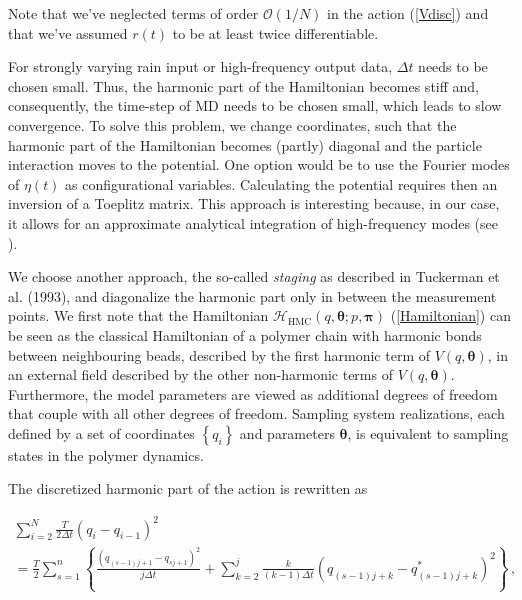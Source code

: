 \documentclass[11pt, a4paper]{article}
\newcommand{\bt}{\pmb\theta}
\begin{document}
Note that we've neglected terms of order $\mathcal O(1/N)$ in the action (\ref{Vdisc}) and that we've assumed $r(t)$ to be at least twice differentiable.


For strongly varying rain input or high-frequency output data, $\Delta t$ needs to be chosen small. Thus, the harmonic part of the Hamiltonian becomes stiff and, consequently, the time-step of MD needs to be chosen small, which leads to slow convergence.
To solve this problem, we change coordinates, such that the harmonic part of the Hamiltonian becomes (partly) diagonal and the particle interaction moves to the potential.
One option would be to use the Fourier modes of ${\eta}(t)$ as configurational variables. Calculating the potential requires then an inversion of a Toeplitz matrix. This approach is interesting because, in our case, it allows for an approximate analytical integration of high-frequency modes (see \cite{doll_1985_fourier}).

We choose another approach, the so-called \emph{staging} as described in Tuckerman et al. (1993), and diagonalize the harmonic part only in between the measurement points.
We first note that the Hamiltonian $\mathcal{H}_{\text{HMC}}(q,\bt; p,{\pmb\pi})$ (\ref{Hamiltonian}) can be seen as the classical Hamiltonian of a polymer chain with harmonic bonds between neighbouring beads, described by the first harmonic term of $V(q,\bt)$, in an external field described by the other non-harmonic terms of $V(q,\bt)$. 
Furthermore, the model parameters are viewed as additional degrees of freedom that couple with all other degrees of freedom. 
Sampling system realizations, each defined by a set of coordinates $\left\{ q_i\right\}$ and parameters $\bt$, is equivalent to sampling states in the polymer dynamics.

The discretized harmonic part of the action is rewritten as

\begin{multline}
  \sum_{i=2}^{N}
  \frac{T}{2\Delta t}
  (q_i-q_{i-1})^2
  \\ =
  \frac{T}{2}
  \sum_{s=1}^{n}\left\{
    \frac{(q_{(s-1)j+1} - q_{sj+1})^2}{j\Delta t}
    +
    \sum_{k=2}^j
    \frac{k}{(k-1)\Delta t}
    (q_{(s-1)j+k}-q^*_{(s-1)j+k})^2
  \right\}\,,
\end{multline}
\end{document}
